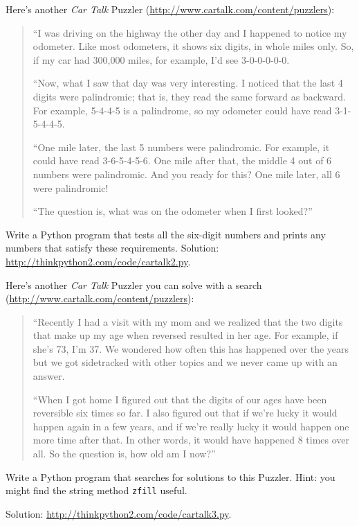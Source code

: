 \documentclass[10pt]{book}
\begin{document}
\begin{exercise}
Here's another {\em Car Talk}
Puzzler (\url{http://www.cartalk.com/content/puzzlers}):

\begin{quote}
``I was driving on the highway the other day and I happened to
notice my odometer. Like most odometers, it shows six digits,
in whole miles only. So, if my car had 300,000
miles, for example, I'd see 3-0-0-0-0-0.

``Now, what I saw that day was very interesting. I noticed that the
last 4 digits were palindromic; that is, they read the same forward as
backward. For example, 5-4-4-5 is a palindrome, so my odometer
could have read 3-1-5-4-4-5.

``One mile later, the last 5 numbers were palindromic. For example, it
could have read 3-6-5-4-5-6.  One mile after that, the middle 4 out of
6 numbers were palindromic.  And you ready for this? One mile later,
all 6 were palindromic!

``The question is, what was on the odometer when I first looked?''
\end{quote}

Write a Python program that tests all the six-digit numbers and prints
any numbers that satisfy these requirements.  
Solution: \url{http://thinkpython2.com/code/cartalk2.py}.

\end{exercise}


\begin{exercise}
Here's another {\em Car Talk} Puzzler you can solve with a
search (\url{http://www.cartalk.com/content/puzzlers}):

\begin{quote}
``Recently I had a visit with my mom and we realized that
the two digits that make up my age when reversed resulted in her
age. For example, if she's 73, I'm 37. We wondered how often this has
happened over the years but we got sidetracked with other topics and
we never came up with an answer.

``When I got home I figured out that the digits of our ages have been
reversible six times so far. I also figured out that if we're lucky it
would happen again in a few years, and if we're really lucky it would
happen one more time after that. In other words, it would have
happened 8 times over all. So the question is, how old am I now?''

\end{quote}

Write a Python program that searches for solutions to this Puzzler.
Hint: you might find the string method {\tt zfill} useful.

Solution: \url{http://thinkpython2.com/code/cartalk3.py}.

\end{exercise}
\end{document}
